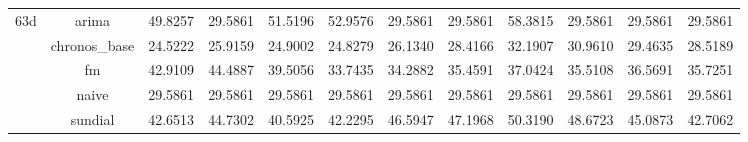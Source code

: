 \begin{table}[H]
{\begin{tabular}{cccccccccccc}
\multirow[c]{5}{*}{63d} & arima & 49.8257 & 29.5861 & 51.5196 & 52.9576 & 29.5861 & 29.5861 & 58.3815 & 29.5861 & 29.5861 & 29.5861 \\
 & chronos_base & 24.5222 & 25.9159 & 24.9002 & 24.8279 & 26.1340 & 28.4166 & 32.1907 & 30.9610 & 29.4635 & 28.5189 \\
 & fm & 42.9109 & 44.4887 & 39.5056 & 33.7435 & 34.2882 & 35.4591 & 37.0424 & 35.5108 & 36.5691 & 35.7251 \\
 & naive & 29.5861 & 29.5861 & 29.5861 & 29.5861 & 29.5861 & 29.5861 & 29.5861 & 29.5861 & 29.5861 & 29.5861 \\
 & sundial & 42.6513 & 44.7302 & 40.5925 & 42.2295 & 46.5947 & 47.1968 & 50.3190 & 48.6723 & 45.0873 & 42.7062 \\
\bottomrule
\end{tabular}

 }
\end{table}